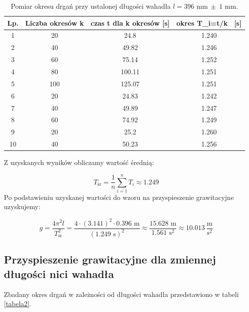 \documentclass[a4paper,12pts]{article}
\begin{document}
	\begin{table}[!h]
		\centering
		\begin{tabular}{ | c | c | c | c | }
			\hline
			\textrm{Lp.} & \textrm{Liczba okresów } k & \textrm{czas } t \textrm{ dla } k \textrm{ okresów [s]} & \textrm{okres } T_i=t/k \textrm{~[s]} \\ \hline
			1 & 20 & 24.8 & 1.240 \\ \hline
			2 & 40 & 49.82 & 1.246 \\ \hline
			3 & 60 & 75.14 & 1.252 \\ \hline
			4 & 80 & 100.11 & 1.251 \\ \hline
			5 & 100 & 125.07 & 1.251 \\ \hline
			6 & 20 & 24.83 & 1.242 \\ \hline
			7 & 40 & 49.89 & 1.247 \\ \hline
			8 & 60 & 74.92 & 1.249 \\ \hline
			9 & 20 & 25.2 & 1.260 \\ \hline
			10 & 40 & 50.23 & 1.256 \\ \hline
		\end{tabular}
		\caption{Pomiar okresu drgań przy ustalonej długości wahadła $l=396$ mm$~\pm~1$ mm.}
		\label{Tabela1}	
	\end{table}

	Z uzyskanych wyników obliczamy wartość średnią:
	
	\begin{equation}
		T_{\textrm{śr}} = \frac{1}{n} \sum_{i = 1}^{n} T_i \approx 1.249
	\end{equation}
	Po podstawieniu uzyskanej wartości do wzoru na przyspieszenie grawitacyjne uzyskujemy:
	
	\begin{equation}
		g = \frac{4 \pi^2 l}{T^2_{\textrm{śr}}} = \frac{4 \cdot (3.141)^2 \cdot 0.396 \textrm{ m}}{(1.249 \textrm{ s})^2} %
		\approx \frac{15.628 \textrm{ m}}{1.561 \textrm{ s}^2} \approx 10.013 ~\frac{\textrm{m}}{\textrm{s}^2}
	\end{equation}
	\label{gStala}
	
	
	\subsection{Przyspieszenie grawitacyjne dla zmiennej długości nici wahadła}
	
	Zbadany okres drgań w zależności od długości wahadła przedstawiono w tabeli \ref{tabela2}.
	
\end{document}
